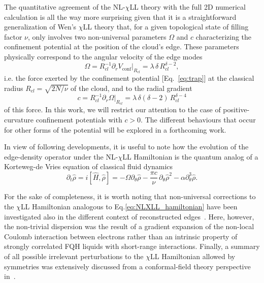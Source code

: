 \documentclass[twocolumn,pra,superscriptaddress,noshowpacs]{revtex4}
\newcommand{\nlchill}{NL-$\chi$LL }
\begin{document}
The quantitative agreement of the \nlchill theory with the full 2D numerical calculation is all the way more surprising given that it is a straightforward generalization of Wen's $\chi$LL theory that, for a given topological state of filling factor $\nu$, only involves two non-universal parameters $\Omega$ and $c$ characterizing the confinement potential at the position of the cloud's edge. These parameters physically correspond to the angular velocity of the edge modes 
\begin{equation}
    \label{eq:angular_velocity}\Omega=R_{cl}^{-1} \partial_r V_\text{conf}|_{R_{cl}}=\lambda \,\delta\, R_{cl}^{\delta-2},
\end{equation}
i.e. the force exerted by the confinement potential [Eq.~\eqref{eq:trap}] at the classical radius $R_{cl}=\sqrt{2N/\nu}$ of the cloud, and to the radial gradient 
\begin{equation}
    \label{eq:curvature}
    c=R_{cl}^{-1} \partial_r \Omega|_{R_{cl}}=\lambda\, \delta (\delta-2)\, R_{cl}^{\delta-4}
\end{equation} 
of this force.
In this work, we will restrict our attention to the case of positive-curvature confinement potentials with $c>0$. 
The different behaviours that occur for other forms of the potential will be explored in a forthcoming work.
            
In view of following developments, it is useful to note how the evolution of the edge-density operator under the \nlchill Hamiltonian is the quantum analog of a Korteweg-de Vries equation of classical fluid dynamics
    \begin{equation}
        \label{eq:qKdV}
    	\partial_t \hat{\rho} = 
    	i[\hat{H},\hat{\rho}]=
    	-\Omega \partial_{\theta}\hat{\rho}
    	-\frac{\pi c}{\nu}\,\partial_{\theta}\hat{\rho}^2
    	-\alpha\partial_{\theta}^3\hat{\rho}.
    \end{equation}

    For the sake of completeness, it is worth noting that non-universal corrections to the $\chi$LL Hamiltonian analogous to Eq.\eqref{eq:NLXLL_hamiltonian} have been investigated also in the different context of reconstructed edges~\cite{KunYang_PRL_2003}. Here, however, the non-trivial dispersion was the result of a gradient expansion of the non-local Coulomb interaction between electrons rather than an intrinsic property of strongly correlated FQH liquids with short-range interactions. Finally, a summary of all possible irrelevant perturbations to the $\chi$LL Hamiltonian allowed by symmetries was extensively discussed  from a conformal-field theory perspective in~\cite{Fern_PRB_2018}.
\end{document}

